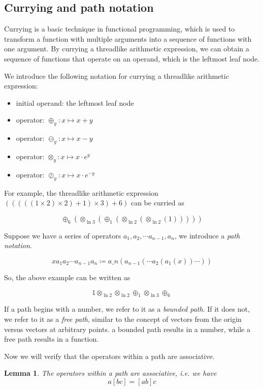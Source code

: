 \documentclass{article}
\numberwithin{definition}{section}
\newtheorem{lemma}{Lemma}
\numberwithin{lemma}{section}
\numberwithin{proposition}{section}
\numberwithin{corollary}{section}
\numberwithin{theorem}{section}
\begin{document}
\subsection{Currying and path notation}\label{subsec:currying}

Currying is a basic technique in functional programming\cite{Reynolds1972DefinitionalIF},
which is used to transform a function with multiple arguments into a sequence of functions with one argument.
By currying a threadlike arithmetic expression, we can obtain a sequence of functions that operate on an operand, which is the leftmost leaf node.

We introduce the following notation for currying a threadlike arithmetic expression:
\begin{itemize}
    \item initial operand: the leftmost leaf node
    \item operator: $\oplus_y: x \mapsto x + y$
    \item operator: $\ominus_y: x \mapsto x - y$
    \item operator: $\otimes_y: x \mapsto x \cdot e^y$
    \item operator: $\oslash_y: x \mapsto x \cdot e^{-y}$
\end{itemize}

For example, the threadlike arithmetic expression $(((((1 \times 2) \times 2) + 1) \times 3) + 6)$ can be curried as

\[\oplus_6(\otimes_{\ln 3}(\oplus_1(\otimes_{\ln 2}(\otimes_{\ln 2}(1)))))\]

Suppose we have a series of operators $a_1, a_2, \cdots a_{n-1}, a_n$, we introduce a \emph{path notation}.

\[x a_1 a_2 \cdots a_{n-1} a_n \coloneqq a\_n( a_{n-1}( \cdots a_2( a_1(x) ) \cdots ) )\]

So, the above example can be written as

\[1 \otimes_{\ln 2} \otimes_{\ln 2} \oplus_1 \otimes_{\ln 3} \oplus_6 \]

If a path begins with a number, we refer to it as a \emph{bounded path}.
If it does not, we refer to it as a \emph{free path}, similar to the concept of vectors from the origin versus vectors at arbitrary points.
a bounded path results in a number, while a free path results in a function.

Now we will verify that the operators within a path are associative.

\begin{lemma}\label{lemma:associative}
The operators within a path are associative, i.e. we have \[a [b c] = [a b] c\]
\end{lemma}
\end{document}
